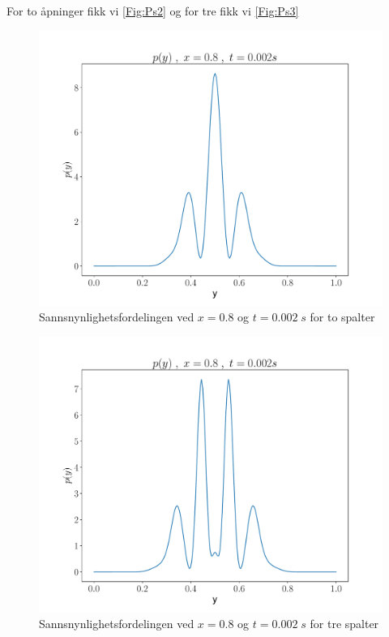 \documentclass[reprint,english,notitlepage]{revtex4-2}  %
\begin{document}
For to åpninger fikk vi \autoref{Fig:Ps2} og for tre fikk vi \autoref{Fig:Ps3}


\begin{figure}[H]
	\centering
	\includegraphics[scale=0.4]{../Images/ScreenProb2Slit.pdf}
	\caption{Sannsnynlighetsfordelingen ved $x = 0.8$ og $t = 0.002 \; s$ for to spalter}
	\label{Fig:Ps2}
\end{figure}


\begin{figure}[H]
	\centering
	\includegraphics[scale=0.4]{../Images/ScreenProb3Slit.pdf}
	\caption{Sannsnynlighetsfordelingen ved $x = 0.8$ og $t = 0.002 \; s$ for tre spalter}
	\label{Fig:Ps3}
\end{figure}
\end{document}
